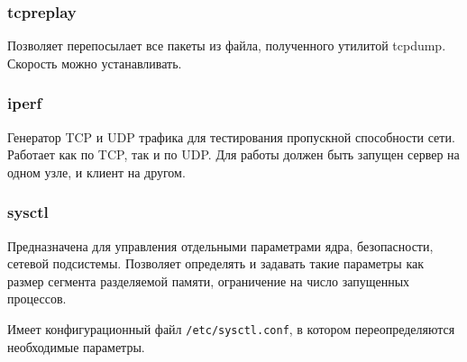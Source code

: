 \subsubsection{tcpreplay}
Позволяет перепосылает все пакеты из файла, полученного утилитой tcpdump. Скорость можно устанавливать.

\subsubsection{iperf}
Генератор TCP и UDP трафика для тестирования пропускной способности сети. Работает как по TCP, так и по UDP. Для работы должен быть запущен сервер на одном узле, и клиент на другом.

\subsubsection{sysctl}
Предназначена для управления отдельными параметрами ядра, безопасности, сетевой подсистемы. Позволяет определять и задавать такие параметры как размер сегмента разделяемой памяти, ограничение на число запущенных процессов.

Имеет конфигурационный файл \texttt{/etc/sysctl.conf}, в котором переопределяются необходимые параметры.
